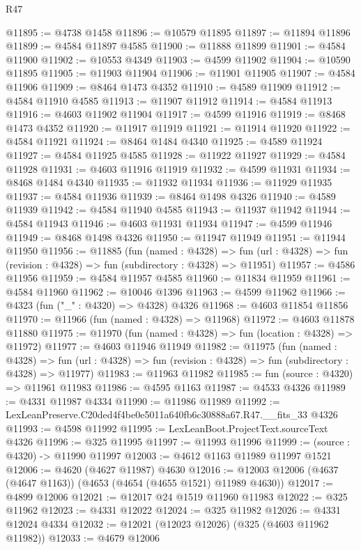 \begin{lexlean}{R47}
\begin{coremodule}
@11895 := @4738 @1458
@11896 := @10579 @11895
@11897 := @11894 @11896
@11899 := @4584 @11897 @4585
@11900 := @11888 @11899
@11901 := @4584 @11900
@11902 := @10553 @4349
@11903 := @4599 @11902
@11904 := @10590 @11895
@11905 := @11903 @11904
@11906 := @11901 @11905
@11907 := @4584 @11906
@11909 := @8464 @1473 @4352
@11910 := @4589 @11909
@11912 := @4584 @11910 @4585
@11913 := @11907 @11912
@11914 := @4584 @11913
@11916 := @4603 @11902 @11904
@11917 := @4599 @11916
@11919 := @8468 @1473 @4352
@11920 := @11917 @11919
@11921 := @11914 @11920
@11922 := @4584 @11921
@11924 := @8464 @1484 @4340
@11925 := @4589 @11924
@11927 := @4584 @11925 @4585
@11928 := @11922 @11927
@11929 := @4584 @11928
@11931 := @4603 @11916 @11919
@11932 := @4599 @11931
@11934 := @8468 @1484 @4340
@11935 := @11932 @11934
@11936 := @11929 @11935
@11937 := @4584 @11936
@11939 := @8464 @1498 @4326
@11940 := @4589 @11939
@11942 := @4584 @11940 @4585
@11943 := @11937 @11942
@11944 := @4584 @11943
@11946 := @4603 @11931 @11934
@11947 := @4599 @11946
@11949 := @8468 @1498 @4326
@11950 := @11947 @11949
@11951 := @11944 @11950
@11956 := @11885
    (fun (named : @4328) =>
    fun (url : @4328) => fun (revision : @4328) => fun (subdirectory : @4328) => @11951)
@11957 := @4586 @11956
@11959 := @4584 @11957 @4585
@11960 := @11834 @11959
@11961 := @4584 @11960
@11962 := @10046 @1396
@11963 := @4599 @11962
@11966 := @4323 (fun ("_" : @4320) => @4328) @4326
@11968 := @4603 @11854 @11856
@11970 := @11966 (fun (named : @4328) => @11968)
@11972 := @4603 @11878 @11880
@11975 := @11970 (fun (named : @4328) => fun (location : @4328) => @11972)
@11977 := @4603 @11946 @11949
@11982 := @11975
    (fun (named : @4328) =>
    fun (url : @4328) => fun (revision : @4328) => fun (subdirectory : @4328) => @11977)
@11983 := @11963 @11982
@11985 := fun (source : @4320) => @11961 @11983
@11986 := @4595 @1163
@11987 := @4533 @4326
@11989 := @4331 @11987 @4334
@11990 := @11986 @11989
@11992 := LexLeanPreserve.C20ded4f4be0e5011a640fb6c30888a67.R47.__fits_33 @4326
@11993 := @4598 @11992
@11995 := LexLeanBoot.ProjectText.sourceText @4326
@11996 := @325 @11995
@11997 := @11993 @11996
@11999 := (source : @4320) -> @11990 @11997
@12003 := @4612 @1163 @11989 @11997 @1521
@12006 := @4620 (@4627 @11987) @4630
@12016 := @12003 @12006 (@4637 (@4647 @1163)) (@4653 (@4654 (@4655 @1521) @11989 @4630))
@12017 := @4899 @12006
@12021 := @12017 @24 @1519 @11960 @11983
@12022 := @325 @11962
@12023 := @4331 @12022
@12024 := @325 @11982
@12026 := @4331 @12024 @4334
@12032 := @12021 (@12023 @12026) (@325 (@4603 @11962 @11982))
@12033 := @4679 @12006

\end{coremodule}
\end{lexlean}
